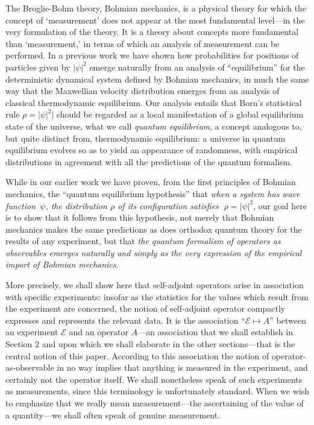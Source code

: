 \documentclass[12pt]{article}
\newcommand{\sa}{self-adjoint}
\newcommand{\BM}{Bohmian mechanics}
\newcommand{\wf}{wave function}
\newcommand{\E}{\mbox{$\mathscr{E}$}}
\begin{document}
The Broglie-Bohm theory, Bohmian mechanics, is a physical theory for
which the concept of `measurement' does not appear at the most
fundamental level---in the very formulation of the theory. It is a
theory about concepts more fundamental than `measurement,' in terms of
which an analysis of measurement can be performed. In a previous work
\cite{DGZ92a} we have shown how probabilities for positions of
particles given by $|\psi|^2$ emerge naturally {}from an analysis of
``equilibrium'' for the deterministic dynamical system defined by
Bohmian mechanics, in much the same way that the Maxwellian velocity
distribution emerges {}from an analysis of classical thermodynamic
equilibrium.  Our analysis entails that Born's statistical rule
$\rho=|\psi|^{2}|$ should be regarded as a local manifestation of a
global equilibrium state of the universe, what we call \emph{quantum
   equilibrium}, a concept analogous to, but quite distinct {}from,
thermodynamic equilibrium: a universe in quantum equilibrium evolves
so as to yield an appearance of randomness, with empirical
distributions in agreement with all the predictions of the quantum
formalism.

While in our earlier work we have proven, {}from the first principles
of \BM{}, the ``quantum equilibrium hypothesis'' that \emph{when a
   system has \wf\ $\psi$, the distribution $\rho$ of its configuration
   satisfies $\;\rho = |\psi|^2$}, our goal here is to show that it
follows {}from this hypothesis, not merely that \BM{} makes the same
predictions as does orthodox quantum theory for the results of any
experiment, but that \emph{the quantum formalism of operators as
   observables emerges naturally and simply as the very expression of
   the empirical import of \BM{}}.

More precisely, we shall show here that \sa{} operators arise in
association with specific experiments: insofar as the statistics for
the values which result {}from the experiment are concerned, the
notion of \sa{} operator compactly expresses and represents the
relevant data.  It is the association ``$\E\mapsto A$'' between an
experiment \E{} and an operator $A$---an association that we shall
establish in Section 2 and upon which we shall elaborate in the other
sections---that is the central notion of this paper. According to this
association the notion of operator-as-observable in no way implies
that anything is measured in the experiment, and certainly not the
operator itself.  We shall nonetheless speak of such experiments as
measurements, since this terminology is unfortunately standard. When
we wish to emphasize that we really mean measurement---the
ascertaining of the value of a quantity---we shall often speak of
genuine measurement.
\end{document}
